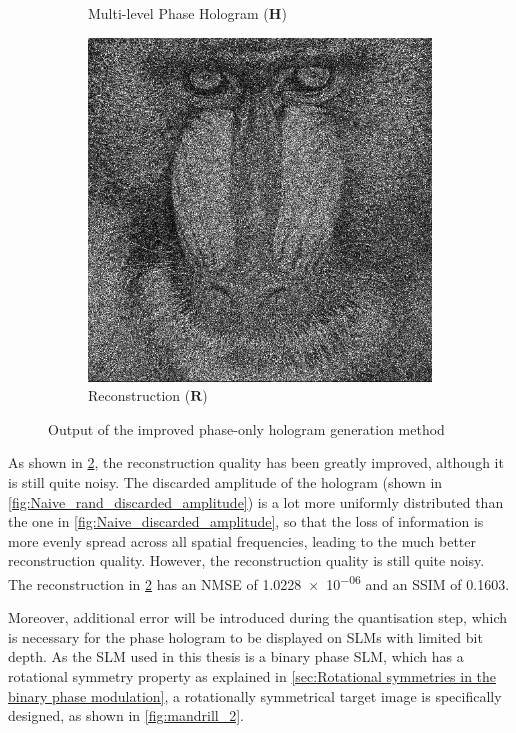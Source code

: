 \begin{figure}[H]
\begin{subfigure}[t]{0.3\textwidth}
    \caption{Multi-level Phase Hologram ($\textbf{H}$)}
    \label{fig:Naive_rand_holo}
  \end{subfigure}
  \hfill
  \begin{subfigure}[t]{0.3\textwidth}
    \centering
    \includegraphics[width=\textwidth]{Naive_rand_recon.png}
    \caption{Reconstruction ($\textbf{R}$)}
    \label{fig:Naive_rand_recon}
  \end{subfigure}
  \caption{Output of the improved phase-only hologram generation method}
  \label{fig:Output of the improved Naive method}
\end{figure}

As shown in \cref{fig:Naive_rand_recon}, the reconstruction quality has been greatly improved, although it is still quite noisy. The discarded amplitude of the hologram (shown in \cref{fig:Naive_rand_discarded_amplitude}) is a lot more uniformly distributed than the one in \cref{fig:Naive_discarded_amplitude}, so that the loss of information is more evenly spread across all spatial frequencies, leading to the much better reconstruction quality. However, the reconstruction quality is still quite noisy. The reconstruction in \cref{fig:Naive_rand_recon} has an NMSE of \num{1.0228e-06} and an SSIM of 0.1603.

Moreover, additional error will be introduced during the quantisation step, which is necessary for the phase hologram to be displayed on SLMs with limited bit depth. As the SLM used in this thesis is a binary phase SLM, which has a rotational symmetry property as explained in \cref{sec:Rotational symmetries in the binary phase modulation}, a rotationally symmetrical target image is specifically designed, as shown in \cref{fig:mandrill_2}.

